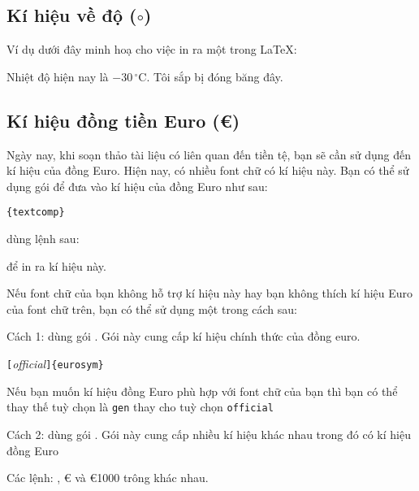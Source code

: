 \subsection{Kí hiệu về độ \texorpdfstring{($\circ$)}{}}

Ví dụ dưới đây minh hoạ cho việc in ra một  trong
\LaTeX{}:
\begin{example}
Nhiệt độ hiện nay là $-30\,
^{\circ}\mathrm{C}$. Tôi sắp
bị đóng
băng đây.
\end{example}

\subsection{Kí hiệu đồng tiền Euro \texorpdfstring{(\euro{})}{}}

Ngày nay, khi soạn thảo tài liệu có liên quan đến tiền tệ, bạn sẽ cần sử dụng đến kí hiệu của đồng Euro. Hiện nay, có nhiều font chữ có kí hiệu này. Bạn có thể sử dụng gói  để đưa vào kí hiệu của đồng Euro như sau:

\begin{lscommand}
\verb|{textcomp}|
\end{lscommand}

\noindent dùng lệnh sau:
\begin{lscommand}
\end{lscommand}

\noindent để in ra kí hiệu này.

Nếu font chữ của bạn không hỗ trợ kí hiệu này hay bạn không thích kí hiệu Euro của font chữ trên, bạn có thể sử dụng một trong cách sau:

Cách 1: dùng gói . Gói này cung cấp kí hiệu chính thức của đồng euro.
\begin{lscommand}
\verb|[|\emph{official}\verb|]{eurosym}|
\end{lscommand}
Nếu bạn muốn kí hiệu đồng Euro phù hợp với font chữ của bạn thì bạn có thể thay thế tuỳ chọn là \texttt{gen} thay cho tuỳ chọn \texttt{official}

Cách 2: dùng gói . Gói này cung cấp nhiều kí hiệu khác nhau trong đó có kí hiệu đồng Euro
\begin{lscommand}
\end{lscommand}
\begin{example}
Các lệnh: \texteuro{}, \euro{}
và \euro{1000} trông khác nhau.
\end{example}

